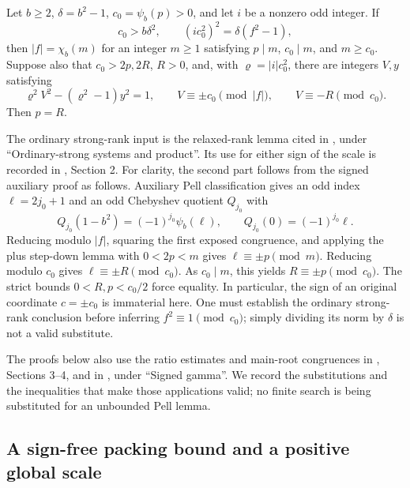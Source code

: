 \begin{lemma}
Let \(b\geq2\), \(\delta=b^2-1\),
\(c_0=\psi_b(p)>0\), and let \(i\) be a nonzero odd integer.
If
\[
 c_0>b\delta^2,\qquad (ic_0^2)^2=\delta(f^2-1),
\]
then \(|f|=\chi_b(m)\) for an integer \(m\geq1\) satisfying
\(p\mid m\), \(c_0\mid m\), and \(m\geq c_0\).
Suppose also that \(c_0>2p,2R\), \(R>0\), and, with
\(\varrho=|i|c_0^2\), there are integers \(V,y\) satisfying
\[
 \varrho^2V^2-(\varrho^2-1)y^2=1,\qquad
 V\equiv\pm c_0\pmod{|f|},\qquad V\equiv-R\pmod{c_0}.
\]
Then \(p=R\).
\end{lemma}

The ordinary strong-rank input is the relaxed-rank lemma cited in
, under ``Ordinary-strong systems and
product''.  Its use for either sign of the scale is recorded in
, Section 2.  For clarity, the second
part follows from the signed auxiliary proof as follows.  Auxiliary Pell
classification gives an odd index \(\ell=2j_0+1\) and an odd Chebyshev
quotient \(Q_{j_0}\) with
\[
 Q_{j_0}(1-b^2)=(-1)^{j_0}\psi_b(\ell),\qquad
 Q_{j_0}(0)=(-1)^{j_0}\ell.
\]
Reducing modulo \(|f|\), squaring the first exposed congruence, and
applying the plus step-down lemma with \(0<2p<m\) gives
\(\ell\equiv\pm p\pmod m\).  Reducing modulo \(c_0\) gives
\(\ell\equiv\pm R\pmod{c_0}\).  As \(c_0\mid m\), this yields
\(R\equiv\pm p\pmod{c_0}\).  The strict bounds
\(0<R,p<c_0/2\) force equality.  In particular, the sign of an original
coordinate \(c=\pm c_0\) is immaterial here.  One must establish the
ordinary strong-rank conclusion before inferring
\(f^2\equiv1\pmod{c_0}\); simply dividing its norm by \(\delta\) is not
a valid substitute.

The proofs below also use the ratio estimates and main-root congruences
in , Sections 3--4, and in
, under ``Signed gamma''.  We record
the substitutions and the inequalities that make those applications
valid; no finite search is being substituted for an unbounded Pell lemma.

\subsection{A sign-free packing bound and a positive global scale}

